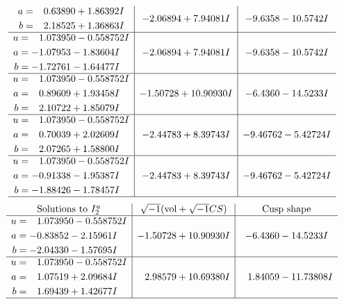 \documentclass[1p]{elsarticle_modified}
\theoremstyle{definition}
\newcommand{\I}{\sqrt{-1}}
\begin{document}
$$\begin{array}{c|c|c}
\begin{aligned}
a &= \phantom{-}0.63890 + 1.86392 I \\
b &= \phantom{-}2.18525 + 1.36863 I\end{aligned}
 & -2.06894 + 7.94081 I & -9.6358 - 10.5742 I \\ \hline\begin{aligned}
u &= \phantom{-}1.073950 - 0.558752 I \\
a &= -1.07953 - 1.83604 I \\
b &= -1.72761 - 1.64477 I\end{aligned}
 & -2.06894 + 7.94081 I & -9.6358 - 10.5742 I \\ \hline\begin{aligned}
u &= \phantom{-}1.073950 - 0.558752 I \\
a &= \phantom{-}0.89609 + 1.93458 I \\
b &= \phantom{-}2.10722 + 1.85079 I\end{aligned}
 & -1.50728 + 10.90930 I & -6.4360 - 14.5233 I \\ \hline\begin{aligned}
u &= \phantom{-}1.073950 - 0.558752 I \\
a &= \phantom{-}0.70039 + 2.02609 I \\
b &= \phantom{-}2.07265 + 1.58800 I\end{aligned}
 & -2.44783 + 8.39743 I & -9.46762 - 5.42724 I \\ \hline\begin{aligned}
u &= \phantom{-}1.073950 - 0.558752 I \\
a &= -0.91338 - 1.95387 I \\
b &= -1.88426 - 1.78457 I\end{aligned}
 & -2.44783 + 8.39743 I & -9.46762 - 5.42724 I\\
 \hline 
 \end{array}$$\newpage$$\begin{array}{c|c|c}  
\text{Solutions to }I^u_{2}& \I (\text{vol} + \sqrt{-1}CS) & \text{Cusp shape}\\
 \hline 
\begin{aligned}
u &= \phantom{-}1.073950 - 0.558752 I \\
a &= -0.83852 - 2.15961 I \\
b &= -2.04330 - 1.57695 I\end{aligned}
 & -1.50728 + 10.90930 I & -6.4360 - 14.5233 I \\ \hline\begin{aligned}
u &= \phantom{-}1.073950 - 0.558752 I \\
a &= \phantom{-}1.07519 + 2.09684 I \\
b &= \phantom{-}1.69439 + 1.42677 I\end{aligned}
 & \phantom{-}2.98579 + 10.69380 I & \phantom{-}1.84059 - 11.73808 I\\
 \hline 
 \end{array}$$\newpage\newpage\renewcommand{\arraystretch}{1}
\end{document}
